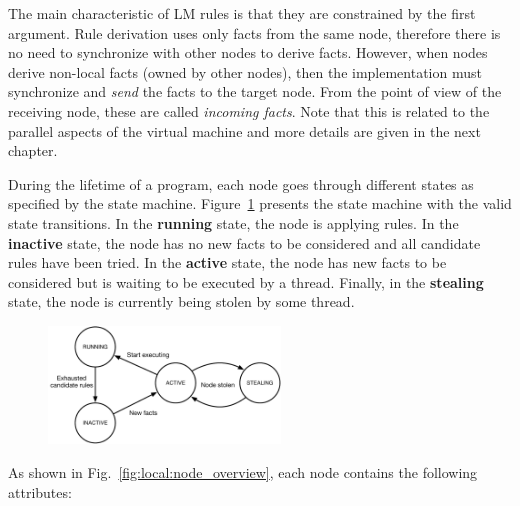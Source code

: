 The main characteristic of LM rules is that they are constrained by the first
argument. Rule derivation uses only facts from the same node, therefore there
is no need to synchronize with other nodes to derive facts. However, when nodes
derive non-local facts (owned by other nodes), then the implementation must
synchronize and \emph{send} the facts to the target node. From the point of view
of the receiving node, these are called \emph{incoming facts}. Note that this is
related to the parallel aspects of the virtual machine and more details are
given in the next chapter.

During the lifetime of a program, each node goes through different states as
specified by the state machine. Figure~\ref{fig:local:node_states} presents the
state machine with the valid state transitions.  In the \textbf{running} state,
the node is applying rules. In the \textbf{inactive} state, the node has no new
facts to be considered and all candidate rules have been tried. In the
\textbf{active} state, the node has new facts to be considered but is waiting to
be executed by a thread. Finally, in the \textbf{stealing} state, the node is
currently being stolen by some thread.

\begin{figure}[ht]
   \centering
   \includegraphics[width=0.55\textwidth]{figures/local/node_state.pdf}
   \label{fig:local:node_states}
\end{figure}

As shown in Fig.~\ref{fig:local:node_overview}, each node contains the
following attributes:

